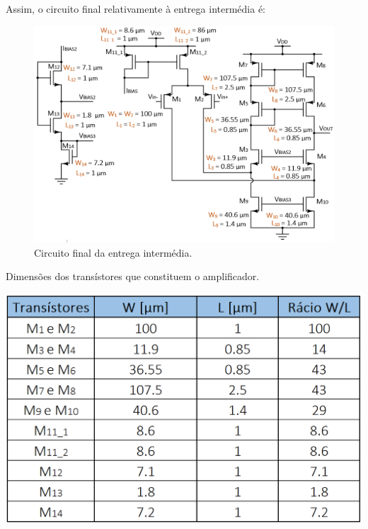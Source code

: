 \documentclass[11pt]{article}
\numberwithin{equation}{section}
\begin{document}
Assim, o circuito final relativamente à entrega intermédia é:

\begin{figure}[H]
	\centering
	\includegraphics[keepaspectratio=true, scale=0.42]{teoricas/circuitoantesdadiv}
	\vspace{-0.5em}
	\caption{Circuito final da entrega intermédia.}
	\vspace{-0.8em}
	\label{fig:finalint}
\end{figure} 

\begin{table}[H]
	\centering
	\caption{Dimensões dos transístores que constituem o amplificador.}
	\vspace{-1.5mm}
	\includegraphics[keepaspectratio=true, scale=0.35]{teoricas/dimensoes1}
\end{table}
\end{document}
